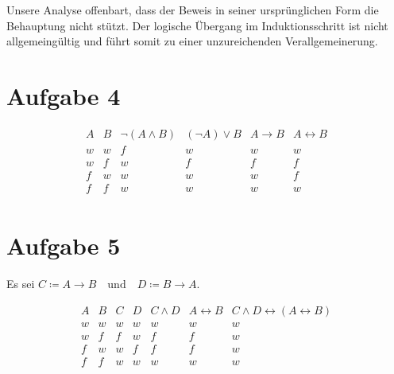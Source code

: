 \documentclass{article}
\begin{document}
Unsere Analyse offenbart, dass der Beweis in seiner ursprünglichen Form die Behauptung nicht stützt. Der logische Übergang im Induktionsschritt ist nicht allgemeingültig und führt somit zu einer unzureichenden Verallgemeinerung.

\section*{Aufgabe 4}

\[
	\begin{array}{cc|c|c|c|c}
		A & B & \neg(A \land B) & (\neg A) \lor B & A \rightarrow B & A \leftrightarrow B \\ \hline
		w & w & f               & w               & w               & w                   \\
		w & f & w               & f               & f               & f                   \\
		f & w & w               & w               & w               & f                   \\
		f & f & w               & w               & w               & w                   \\
	\end{array}
\]

\section*{Aufgabe 5}

Es sei \( C \coloneq A \rightarrow B \quad \text{und} \quad D \coloneq B \rightarrow A \).

\[
	\begin{array}{cc|c|c|c|c|c}
		A & B & C & D & C \land D & A \leftrightarrow B & C \land D \leftrightarrow (A \leftrightarrow B) \\ \hline
		w & w & w & w & w         & w                   & w                                               \\
		w & f & f & w & f         & f                   & w                                               \\
		f & w & w & f & f         & f                   & w                                               \\
		f & f & w & w & w         & w                   & w                                               \\
	\end{array}
\]
\end{document}
